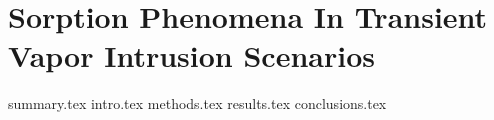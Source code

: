 \documentclass[../thesis.tex]{subfiles}
\begin{document}
\chapter{Sorption Phenomena In Transient Vapor Intrusion Scenarios}

{summary.tex}
{intro.tex}
{methods.tex}
{results.tex}
{conclusions.tex}
\end{document}

